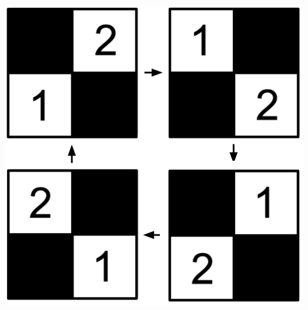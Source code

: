\documentclass{book}
\theoremstyle{definition}
\begin{document}
\begin{center}
\begin{tcolorbox}[width=2.3in,colback={white},coltitle=white]
\begin{center}
\ \\
\\
\end{center}
\end{tcolorbox}
\end{center}
\ \\
\ \\
\ \\
\begin{center}
\includegraphics[scale=0.4]{eckhil.png}
\end{center}





\thispagestyle{empty}


\newpage


\begin{center}

\pagecolor{white}
\color{black}

\end{center}

\thispagestyle{empty}
\end{document}
